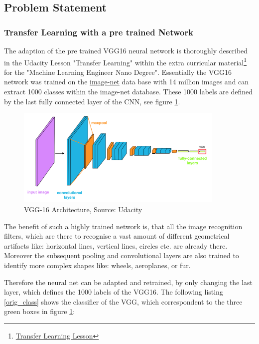 \documentclass[paper=A4, DIV=calc, parskip=half]{scrartcl}
\begin{document}


\subsection*{Problem Statement}

\subsubsection*{Transfer Learning with a pre trained Network}

The adaption of the pre trained VGG16 neural network is thoroughly described in
the Udacity Lesson "Transfer Learning" within the extra curricular
material\footnote{\href{https://classroom.udacity.com/nanodegrees/nd009-ent/parts/a73e944a-fdd9-4469-9c67-a618aab59b18/modules/7862c5aa-2097-4dfa-9776-cbfe245d7b83/lessons/a559990d-e214-4c5d-a424-437f6299383e/concepts/bd6c99ac-2c4f-4a80-9ae4-adb4403666c2}{Transfer
Learning Lesson}} for the "Machine Learning Engineer Nano Degree". Essentially
the VGG16 network was trained on the \href{http://www.image-net.org/}{image-net}
data base with 14 million images and can extract 1000 classes within the
image-net database. These 1000 labels are defined by the last fully connected
layer of the CNN, see figure \ref{vgg16arch}.

\begin{figure}[h]
  \centering
  \includegraphics[width=10cm]{images/vgg_16_architecture.png}
  \caption{VGG-16 Architecture, Source: Udacity}
  \label{vgg16arch}
\end{figure}

The benefit of such a highly trained network is, that all the image recognition
filters, which are there to recognise a vast amount of different geometrical
artifacts like: horizontal lines, vertical lines, circles etc. are already
there. Moreover the subsequent pooling and convolutional layers are also trained
to identify more complex shapes like: wheels, aeroplanes, or fur.

Therefore the neural net can be adapted and retrained, by only changing the last
layer, which defines the 1000 labels of the VGG16. The following listing
\ref{orig_class} shows the classifier of the VGG, which correspondent to the
three green boxes in figure \ref{vgg16arch}:
\end{document}

